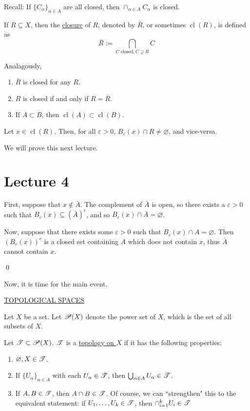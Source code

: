 \documentclass[x11names,reqno,14pt]{extarticle}
\DeclareMathOperator{\cl}{cl}
\begin{document}
Recall: If $\{C_\alpha\}_{\alpha\in A}$ are all closed, then $\cap_{\alpha\in A}C_\alpha$ is closed. 


If $R\subseteq X$, then the \underline{closure} of $R$, denoted by $\bar{R}$, or sometimes $\cl(R)$, is defined as 
\[
\bar{R}:= \bigcap_{C\text{ closed}, C\supseteq R}C
\]

Analagously, 
\begin{enumerate}
\item $\bar{R}$ is closed for any $R$. 
\item $R$ is closed if and only if $R = \bar{R}$. 
\item If $A \subset B$, then $\cl(A) \subset \cl(B)$. 
\end{enumerate}

\prop

Let $x \in \cl(R)$. Then, for all $\varepsilon>0$, $B_\varepsilon(x)\cap R \neq \varnothing$, and vice-versa. 

We will prove this next lecture. 

\section*{Lecture 4}

\proof 

First, suppose that $x\not\in \bar{A}$. The complement of $\bar{A}$ is open, so there exists a $\varepsilon>0$ such that $B_{\varepsilon}(x)\subseteq (\bar{A})^c$, and so $B_{\varepsilon}(x) \cap \bar{A} = \varnothing$. 

Now, suppose that there exists some $\varepsilon> 0$ such that $B_{\varepsilon}(x) \cap A = \varnothing$. Then $(B_{\varepsilon}(x))^c$ is a closed set containing $A$ which does not contain $x$, thus $\bar{A}$ cannot contain $x$. 

\qed

Now, it is time for the main event. 

\underline{TOPOLOGICAL SPACES}

Let $X$ be a set. Let $\mathscr{P}(X)$ denote the power set of $X$, which is the set of all subsets of $X$. 


Let $\mathscr{T} \subset\mathscr{P}(X)$. $\mathscr{T}$ is a \underline{topology on $X$} if it has the following properties: 
\begin{enumerate}
\item $\varnothing, X \in \mathscr{T}$. 
\item If $\{U_\alpha\}_{\alpha\in A}$ with each $U_\alpha \in \mathscr{T}$, then $\bigcup_{\alpha\in A}U_\alpha \in \mathscr{T}$. 
\item If $A, B \in \mathscr{T}$, then $A \cap B \in \mathscr{T}$. Of course, we can ``strengthen" this to the equivalent statement: if $U_1, \dots, U_k \in \mathscr{T}$, then $\cap_{i=1}^kU_i \in \mathscr{T}$
\end{enumerate}
\end{document}
